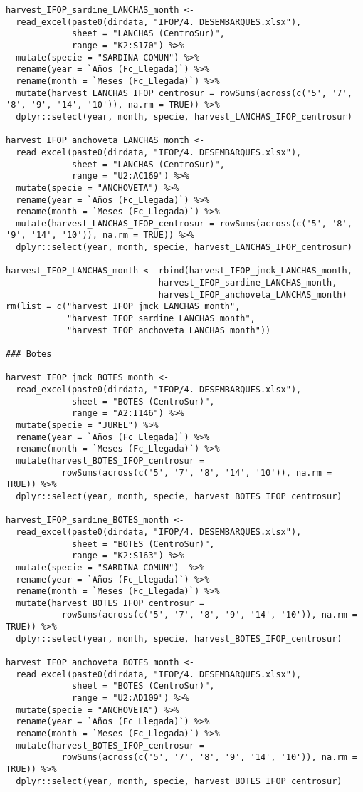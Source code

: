 \begin{verbatim}
harvest_IFOP_sardine_LANCHAS_month <- 
  read_excel(paste0(dirdata, "IFOP/4. DESEMBARQUES.xlsx"), 
             sheet = "LANCHAS (CentroSur)", 
             range = "K2:S170") %>% 
  mutate(specie = "SARDINA COMUN") %>%
  rename(year = `Años (Fc_Llegada)`) %>%
  rename(month = `Meses (Fc_Llegada)`) %>%
  mutate(harvest_LANCHAS_IFOP_centrosur = rowSums(across(c('5', '7', '8', '9', '14', '10')), na.rm = TRUE)) %>% 
  dplyr::select(year, month, specie, harvest_LANCHAS_IFOP_centrosur)

harvest_IFOP_anchoveta_LANCHAS_month <- 
  read_excel(paste0(dirdata, "IFOP/4. DESEMBARQUES.xlsx"),  
             sheet = "LANCHAS (CentroSur)", 
             range = "U2:AC169") %>% 
  mutate(specie = "ANCHOVETA") %>%
  rename(year = `Años (Fc_Llegada)`) %>%
  rename(month = `Meses (Fc_Llegada)`) %>%
  mutate(harvest_LANCHAS_IFOP_centrosur = rowSums(across(c('5', '8', '9', '14', '10')), na.rm = TRUE)) %>% 
  dplyr::select(year, month, specie, harvest_LANCHAS_IFOP_centrosur)

harvest_IFOP_LANCHAS_month <- rbind(harvest_IFOP_jmck_LANCHAS_month, 
                              harvest_IFOP_sardine_LANCHAS_month, 
                              harvest_IFOP_anchoveta_LANCHAS_month)
rm(list = c("harvest_IFOP_jmck_LANCHAS_month", 
            "harvest_IFOP_sardine_LANCHAS_month", 
            "harvest_IFOP_anchoveta_LANCHAS_month"))

### Botes

harvest_IFOP_jmck_BOTES_month <- 
  read_excel(paste0(dirdata, "IFOP/4. DESEMBARQUES.xlsx"), 
             sheet = "BOTES (CentroSur)", 
             range = "A2:I146") %>% 
  mutate(specie = "JUREL") %>%
  rename(year = `Años (Fc_Llegada)`) %>%
  rename(month = `Meses (Fc_Llegada)`) %>%
  mutate(harvest_BOTES_IFOP_centrosur = 
           rowSums(across(c('5', '7', '8', '14', '10')), na.rm = TRUE)) %>% 
  dplyr::select(year, month, specie, harvest_BOTES_IFOP_centrosur)

harvest_IFOP_sardine_BOTES_month <- 
  read_excel(paste0(dirdata, "IFOP/4. DESEMBARQUES.xlsx"), 
             sheet = "BOTES (CentroSur)", 
             range = "K2:S163") %>% 
  mutate(specie = "SARDINA COMUN")  %>%
  rename(year = `Años (Fc_Llegada)`) %>%
  rename(month = `Meses (Fc_Llegada)`) %>%
  mutate(harvest_BOTES_IFOP_centrosur = 
           rowSums(across(c('5', '7', '8', '9', '14', '10')), na.rm = TRUE)) %>% 
  dplyr::select(year, month, specie, harvest_BOTES_IFOP_centrosur)

harvest_IFOP_anchoveta_BOTES_month <- 
  read_excel(paste0(dirdata, "IFOP/4. DESEMBARQUES.xlsx"), 
             sheet = "BOTES (CentroSur)", 
             range = "U2:AD109") %>% 
  mutate(specie = "ANCHOVETA") %>%
  rename(year = `Años (Fc_Llegada)`) %>%
  rename(month = `Meses (Fc_Llegada)`) %>%
  mutate(harvest_BOTES_IFOP_centrosur = 
           rowSums(across(c('5', '7', '8', '9', '14', '10')), na.rm = TRUE)) %>% 
  dplyr::select(year, month, specie, harvest_BOTES_IFOP_centrosur) 


\end{verbatim}
